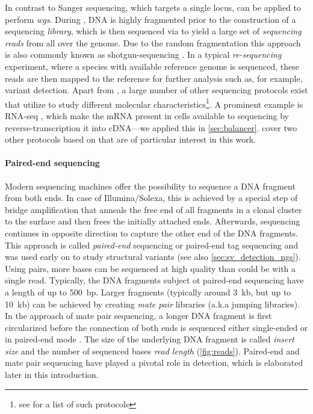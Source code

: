 In contrast to Sanger sequencing, which targets a single locus, \mps can be
applied to perform \emph{\acf{wgs}}. During \wgs, DNA is highly fragmented prior
to the construction of a sequencing \emph{library}, which is then sequenced via \mps to
yield a large set of \emph{sequencing reads} from
all over the genome. Due to the random fragmentation this approach is also
commonly known as shotgun-sequencing \citep{Weber1997}. In a typical
\emph{re-sequencing} experiment, where a species with available reference genome
is sequenced, these reads are then mapped to the reference for further analysis
such as, for example, variant detection. Apart from \wgs, a large number of
other sequencing protocols exist that utilize \mps to study different molecular
characteristics\footnote{see \cite{Pachter2018} for a list of such protocols}.
A prominent example is RNA-seq \citep{Morin2008,Wang2009},
which make the mRNA present in cells available to sequencing by
reverse-transcription it into cDNA---we applied this in \cref{sec:balancer}.
 cover two other protocols based on \mps that are
of particular interest in this work.

\paragraph{Paired-end sequencing}
Modern sequencing machines offer the possibility to sequence a DNA fragment
from both ends. In case of Illumina/Solexa, this is achieved by a special step
of bridge amplification that anneals the free end of all fragments in a clonal
cluster to the surface and then frees the initially attached ends. Afterwards,
sequencing continues in opposite direction to capture the other end of the
DNA fragments. This approach is called \emph{paired-end} sequencing or
paired-end tag sequencing and was used early on to study structural variants
\citep{Campbell2008} (see also \cref{sec:sv_detection_ngs}). Using pairs, more
bases can be sequenced at high quality than could be with a single read.
Typically, the DNA fragments subject ot paired-end sequencing have a length of
up to 500~bp. Larger fragments (typically around 3~kb, but up to 10~kb) can be
achieved by creating \emph{mate pair} libraries (a.k.a jumping libraries). In the
approach of mate pair sequencing, a longer DNA fragment is first circularized before
the connection of both ends is sequenced either single-ended or in paired-end mode
\citep{Korbel2007}. The size of the underlying DNA fragment is called
\emph{insert size} and the number of sequenced bases \emph{read length}
(\cref{fig:reads}). Paired-end and mate pair sequencing have played a pivotal
role in \sv detection, which is elaborated later in this introduction.

